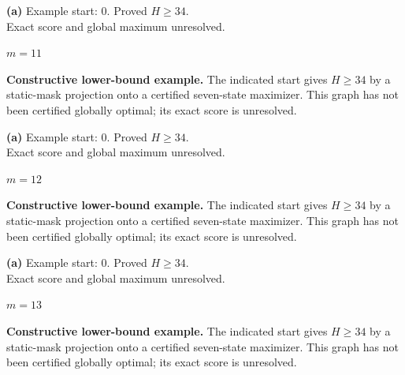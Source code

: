 \documentclass[11pt,a4paper]{article}
\begin{document}
\begin{minipage}[t]{.94\textwidth}\centering
\resizebox{10.3cm}{!}{}\par
\small\textbf{(a)} Example start: $0$. Proved $H\ge34$.\\Exact score and global maximum unresolved.\par\end{minipage}
\clearpage
{\LARGE\bfseries $m=11$}\par\vspace{3mm}
\textbf{Constructive lower-bound example.} The indicated start gives $H\ge34$ by a static-mask projection onto a certified seven-state maximizer. This graph has not been certified globally optimal; its exact score is unresolved.\par\vspace{3mm}
\begin{minipage}[t]{.94\textwidth}\centering
\resizebox{10.3cm}{!}{}\par
\small\textbf{(a)} Example start: $0$. Proved $H\ge34$.\\Exact score and global maximum unresolved.\par\end{minipage}
\clearpage
{\LARGE\bfseries $m=12$}\par\vspace{3mm}
\textbf{Constructive lower-bound example.} The indicated start gives $H\ge34$ by a static-mask projection onto a certified seven-state maximizer. This graph has not been certified globally optimal; its exact score is unresolved.\par\vspace{3mm}
\begin{minipage}[t]{.94\textwidth}\centering
\resizebox{10.3cm}{!}{}\par
\small\textbf{(a)} Example start: $0$. Proved $H\ge34$.\\Exact score and global maximum unresolved.\par\end{minipage}
\clearpage
{\LARGE\bfseries $m=13$}\par\vspace{3mm}
\textbf{Constructive lower-bound example.} The indicated start gives $H\ge34$ by a static-mask projection onto a certified seven-state maximizer. This graph has not been certified globally optimal; its exact score is unresolved.\par\vspace{3mm}
\end{document}
